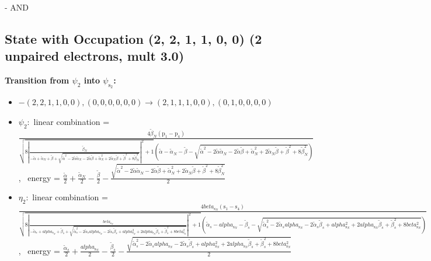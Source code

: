 \documentclass[12pt,a4paper]{article}
\begin{document}
 -  AND 
\subsection*{State with Occupation (2, 2, 1, 1, 0, 0) (2 unpaired electrons, mult 3.0)}
        \noindent\textbf{Transition from $\psi_{2}$ into $\psi_{\text{s}_{2}}$:}
        \begin{itemize}
            \item $- (2, 2, 1, 1, 0, 0), (0, 0, 0, 0, 0, 0) \rightarrow (2, 1, 1, 1, 0, 0), (0, 1, 0, 0, 0, 0)$
        
            \item $\psi_{2}:$ linear combination = $\frac{4 \tilde{\beta}_{N} \left(\text{p}_{1} - \text{p}_{4}\right)}{\sqrt{8 \left|{\frac{\tilde{\beta}_{N}}{- \tilde{\alpha} + \tilde{\alpha}_{N} + \tilde{\beta} + \sqrt{\tilde{\alpha}^{2} - 2 \tilde{\alpha} \tilde{\alpha}_{N} - 2 \tilde{\alpha} \tilde{\beta} + \tilde{\alpha}_{N}^{2} + 2 \tilde{\alpha}_{N} \tilde{\beta} + \tilde{\beta}^{2} + 8 \tilde{\beta}_{N}^{2}}}}\right|^{2} + 1} \left(\tilde{\alpha} - \tilde{\alpha}_{N} - \tilde{\beta} - \sqrt{\tilde{\alpha}^{2} - 2 \tilde{\alpha} \tilde{\alpha}_{N} - 2 \tilde{\alpha} \tilde{\beta} + \tilde{\alpha}_{N}^{2} + 2 \tilde{\alpha}_{N} \tilde{\beta} + \tilde{\beta}^{2} + 8 \tilde{\beta}_{N}^{2}}\right)}$, \
            energy = $\frac{\tilde{\alpha}}{2} + \frac{\tilde{\alpha}_{N}}{2} - \frac{\tilde{\beta}}{2} - \frac{\sqrt{\tilde{\alpha}^{2} - 2 \tilde{\alpha} \tilde{\alpha}_{N} - 2 \tilde{\alpha} \tilde{\beta} + \tilde{\alpha}_{N}^{2} + 2 \tilde{\alpha}_{N} \tilde{\beta} + \tilde{\beta}^{2} + 8 \tilde{\beta}_{N}^{2}}}{2}$
            
            \item $\eta_{2}:$ linear combination = $\frac{4 beta_{\text{s}_N} \left(\text{s}_{1} - \text{s}_{4}\right)}{\sqrt{8 \left|{\frac{beta_{\text{s}_N}}{- \tilde{\alpha}_{s} + alpha_{\text{s}_N} + \tilde{\beta}_{s} + \sqrt{\tilde{\alpha}_{s}^{2} - 2 \tilde{\alpha}_{s} alpha_{\text{s}_N} - 2 \tilde{\alpha}_{s} \tilde{\beta}_{s} + alpha_{\text{s}_N}^{2} + 2 alpha_{\text{s}_N} \tilde{\beta}_{s} + \tilde{\beta}_{s}^{2} + 8 beta_{\text{s}_N}^{2}}}}\right|^{2} + 1} \left(\tilde{\alpha}_{s} - alpha_{\text{s}_N} - \tilde{\beta}_{s} - \sqrt{\tilde{\alpha}_{s}^{2} - 2 \tilde{\alpha}_{s} alpha_{\text{s}_N} - 2 \tilde{\alpha}_{s} \tilde{\beta}_{s} + alpha_{\text{s}_N}^{2} + 2 alpha_{\text{s}_N} \tilde{\beta}_{s} + \tilde{\beta}_{s}^{2} + 8 beta_{\text{s}_N}^{2}}\right)}$, \
            energy = $\frac{\tilde{\alpha}_{s}}{2} + \frac{alpha_{\text{s}_N}}{2} - \frac{\tilde{\beta}_{s}}{2} - \frac{\sqrt{\tilde{\alpha}_{s}^{2} - 2 \tilde{\alpha}_{s} alpha_{\text{s}_N} - 2 \tilde{\alpha}_{s} \tilde{\beta}_{s} + alpha_{\text{s}_N}^{2} + 2 alpha_{\text{s}_N} \tilde{\beta}_{s} + \tilde{\beta}_{s}^{2} + 8 beta_{\text{s}_N}^{2}}}{2}$
            

\end{itemize}
\end{document}
